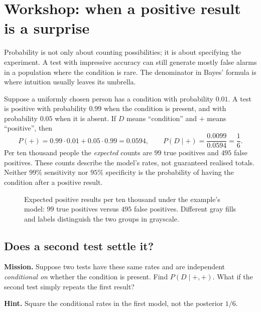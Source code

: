 
\section{Workshop: when a positive result is a surprise}
Probability is not only about counting possibilities; it is about specifying the experiment. A test with impressive accuracy can still generate mostly false alarms in a population where the condition is rare. The denominator in Bayes' formula is where intuition usually leaves its umbrella.

\begin{examplex}
Suppose a uniformly chosen person has a condition with probability $0.01$. A test is positive with probability $0.99$ when the condition is present, and with probability $0.05$ when it is absent. If $D$ means ``condition'' and $+$ means ``positive'', then
\[
P(+)=0.99\cdot0.01+0.05\cdot0.99=0.0594,
\qquad P(D\mid+)=\frac{0.0099}{0.0594}=\frac16.
\]
Per ten thousand people the \emph{expected} counts are $99$ true positives and $495$ false positives. These counts describe the model's rates, not guaranteed realised totals. Neither $99\%$ sensitivity nor $95\%$ specificity is the probability of having the condition after a positive result.
\end{examplex}

\begin{figure}[ht]\centering{}
\caption{Expected positive results per ten thousand under the example's model: $99$ true positives versus $495$ false positives. Different gray fills and labels distinguish the two groups in grayscale.}\end{figure}

\subsection*{Does a second test settle it?}
\textbf{Mission.} Suppose two tests have these same rates and are independent \emph{conditional on} whether the condition is present. Find $P(D\mid+,+)$. What if the second test simply repeats the first result?

\textbf{Hint.} Square the conditional rates in the first model, not the posterior $1/6$.

